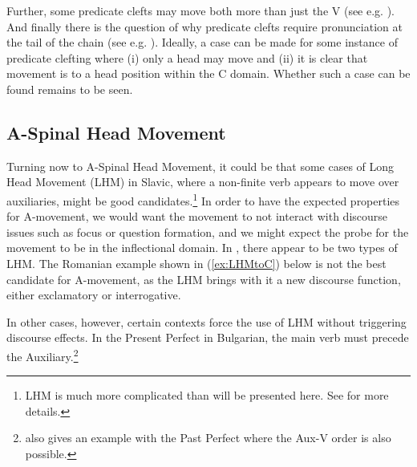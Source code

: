 \documentclass[output=paper,colorlinks,citecolor=brown,
]{langscibook}
\begin{document}
\z

Further, some predicate clefts may move both more than just the V (see e.g. \citet{Vicente:2009}).  And finally there is the question of why predicate clefts require pronunciation at the tail of the chain (see e.g. \citealt{Trinh:2009}).  Ideally, a case can be made for some instance of predicate clefting where (i) only a head may move and (ii) it is clear that movement is to a head position within the C domain.  Whether such a case can be found remains to be seen.

\subsection{A-Spinal Head Movement}

Turning now to A-Spinal Head Movement, it could be that some cases of Long Head Movement (LHM) in Slavic, where a non-finite verb appears to move over auxiliaries, might be good candidates.\footnote{LHM is much more complicated than will be presented here.  See \citet{Harizanov:2018,Lema:1989,Rivero:1991a,Rivero:1994,Roberts:2010} for more details.}  In order to have  the expected properties for A-movement, we would want the movement to  not interact with discourse issues such as focus or question formation, and we might expect the probe for the movement to be in the inflectional domain.  In \citet{Rivero:1994}, there appear to be two types of LHM.  The Romanian example shown in (\ref{ex:LHMtoC}) below is not the best candidate for A-movement, as the LHM brings with it a new discourse function, either exclamatory or interrogative.

\ea\label{ex:LHMtoC}
    \z
\z

In other cases, however, certain contexts force the use of LHM without triggering discourse effects.  In the Present Perfect in Bulgarian, the main verb must precede the Auxiliary.\footnote{\citet{Rivero:1994} also gives an example with the Past Perfect where the Aux-V order is also possible.}
\end{document}
